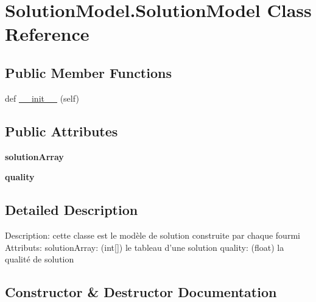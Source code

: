 \hypertarget{class_solution_model_1_1_solution_model}{}\section{Solution\+Model.\+Solution\+Model Class Reference}
\label{class_solution_model_1_1_solution_model}
\subsection*{Public Member Functions}
\begin{DoxyCompactItemize}
\item 
def \mbox{\hyperlink{class_solution_model_1_1_solution_model_af442c5ef771172d03dec082d5de64a20}{\+\_\+\+\_\+init\+\_\+\+\_\+}} (self)
\end{DoxyCompactItemize}
\subsection*{Public Attributes}
\begin{DoxyCompactItemize}
\item 
\mbox{\label{class_solution_model_1_1_solution_model_afed9b63c4bc32f081bd40040161036ac}} 
{\bfseries solution\+Array}
\item 
\mbox{\label{class_solution_model_1_1_solution_model_aff0c87fed25d6998522a8ad3dacb1ce6}} 
{\bfseries quality}
\end{DoxyCompactItemize}


\subsection{Detailed Description}
\begin{DoxyVerb}Description: cette classe est le modèle de solution construite par chaque fourmi
Attributs:
    solutionArray: (int[]) le tableau d'une solution
    quality: (float) la qualité de solution
\end{DoxyVerb}
 

\subsection{Constructor \& Destructor Documentation}
\mbox{\label{class_solution_model_1_1_solution_model_af442c5ef771172d03dec082d5de64a20}} 
